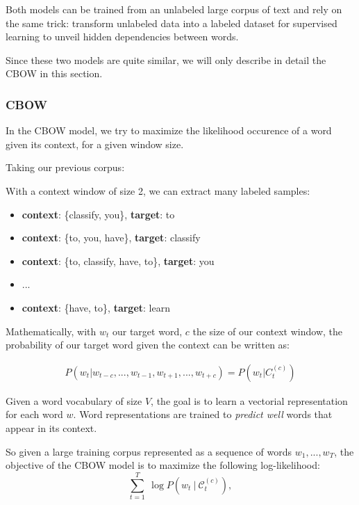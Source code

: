 Both models can be trained from an unlabeled large corpus of text and rely on the same trick: transform unlabeled data into a labeled dataset for supervised learning to unveil hidden dependencies between words.

Since these two models are quite similar, we will only describe in detail the CBOW in this section.

\subsubsection{CBOW}

In the CBOW model, we try to maximize the likelihood occurence of a word given its context, for a given window size.

Taking our previous corpus: 


With a context window of size 2, we can extract many labeled samples:
\begin{itemize}
	\item \textbf{context}: \{classify, you\}, \textbf{target}: to
	\item \textbf{context}: \{to, you, have\}, \textbf{target}: classify
	\item \textbf{context}: \{to, classify, have, to\}, \textbf{target}: you
	\item ...
	\item \textbf{context}: \{have, to\}, \textbf{target}: learn
\end{itemize}


Mathematically, with $w_t$ our target word, $c$ the size of our context window, the probability of our target word given the context can be written as:

\begin{align}
	P(w_t | w_{t-c}, ..., w_{t-1}, w_{t+1}, ... ,w_{t+c}) = P(w_t | C_t^{(c)})
\end{align}

Given a word vocabulary of size $V$, the goal is to learn a vectorial representation for each word $w$. Word representations are trained to \emph{predict well} words that appear in its context.

So given a large training corpus represented as a sequence of words $w_1, ..., w_T$, the objective of the CBOW model is to maximize the following log-likelihood:
\begin{equation*}
  \sum_{t=1}^T \ \log P(w_t \ | \ \mathcal{C}_t^{(c)}),
\end{equation*}

